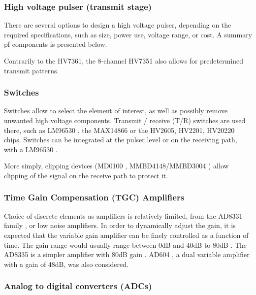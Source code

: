 \documentclass{article}
\begin{document}
\subsubsection{High voltage pulser (transmit stage)}

There are several options to design a high voltage pulser, depending on the required specifications, such as size, power use, voltage range, or cost. A summary pf components is presented below.



Contrarily to the HV7361, the 8-channel HV7351 also allows for predetermined transmit patterns.

\subsubsection{Switches}

Switches allow to select the element of interest, as well as possibly remove unwanted high voltage components. Transmit / receive (T/R) switches are used there, such as LM96530 \cite{vasudevan_programmable_2014}, the MAX14866 or the HV2605, HV2201, HV20220 \cite{li_new_2014} chips. Switches can be integrated at the pulser level \cite{worthing_using_2016, hidayat_determination_2020} or on the receiving path, with a LM96530 \cite{gwirc_desarrollo_2019, roman_open-source_2018}. 

More simply, clipping devices (MD0100 \cite{li_new_2014, sharma_development_2015}, MMBD4148/MMBD3004 \cite{ching_chu_designing_nodate}) allow clipping of the signal on the receive path to protect it.

\subsubsection{Time Gain Compensation (TGC) Amplifiers}

Choice of discrete elements as amplifiers is relatively limited, from the AD8331 family \cite{grasel_characterization_2017,lay_progress_2016,brunner_how_2002}, or low noise amplifiers. In order to dynamically adjust the gain, it is expected that the variable gain amplifier can be finely controlled as a function of time. The gain range would usually range between 0dB and 40dB to 80dB \cite{sharma_development_2015,levesque_architecture_2011}.  The AD8335 is a simpler amplifier with 80dB gain \cite{tortoli_ula-op:_2009}. AD604 \cite{yang_wearable_2019}, a dual variable amplifier with a gain of 48dB, was also considered.

\subsubsection{Analog to digital converters (ADCs)}
\end{document}
